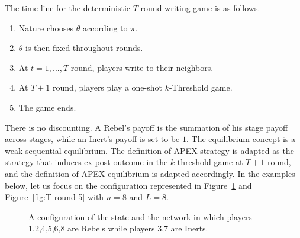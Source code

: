 \documentclass[12pt,letter]{article}
\theoremstyle{definition}
\theoremstyle{remark}
\theoremstyle{claim}
\begin{document}
The time line for the deterministic $T$-round writing game is as follows.
\begin{enumerate}
\item Nature chooses $\theta$ according to $\pi$.
\item $\theta$ is then fixed throughout rounds.
\item At $t=1,...,T$ round, players write to their neighbors. 
\item At $T+1$ round, players play a one-shot $k$-Threshold game.
\item The game ends.
\end{enumerate}

There is no discounting. A Rebel's payoff is the summation of his stage payoff across stages, while an Inert's payoff is set to be $1$. The equilibrium concept is a weak sequential equilibrium. The definition of APEX strategy is adapted as the strategy that induces ex-post outcome in the $k$-threshold game at $T+1$ round, and the definition of APEX equilibrium is adapted accordingly. In the examples below, let us focus on the configuration represented in Figure~\ref{fig:T-round-6} and Figure~\ref{fig:T-round-5} with $n=8$ and $L=8$. 

\begin{figure}
\caption{A configuration of the state and the network in which players 1,2,4,5,6,8 are Rebels while players 3,7 are Inerts.}
\begin{center}
\end{center}

\label{fig:T-round-6}
\end{figure}
\end{document}
